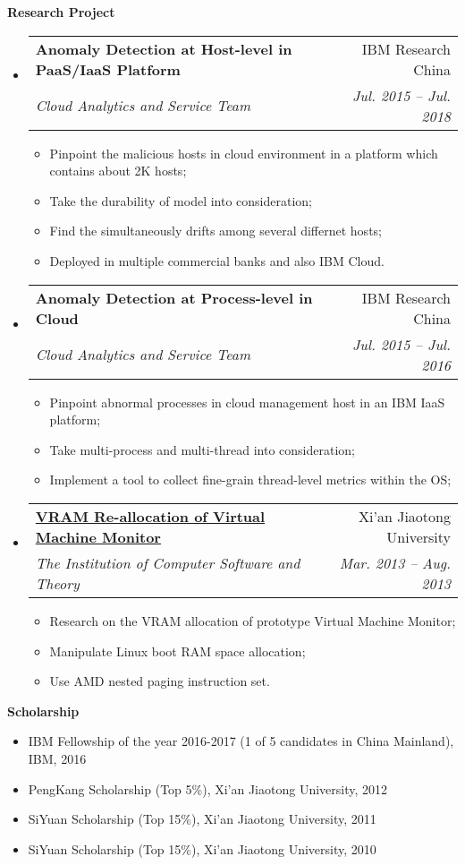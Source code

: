\documentclass[letterpaper,11pt]{article}
\makeatletter
\newcommand{\resitem}[1]{\item #1 \vspace{-2pt}}
\newcommand{\resheading}[1]{{\large \colorbox{mygrey}{\begin{minipage}{\textwidth}{\textbf{#1 \vphantom{p\^{E}}}}\end{minipage}}}}
\newcommand{\ressubheading}[4]{
\begin{tabular*}{6.5in}{l@{\extracolsep{\fill}}r}
		\textbf{#1} & #2 \\
		\textit{#3} & \textit{#4} \\
\end{tabular*}\vspace{-6pt}}
\makeatother
\begin{document}
\resheading{Research Project}
	\begin{itemize}
		\item 
			\ressubheading{Anomaly Detection at Host-level in PaaS/IaaS Platform}{IBM Research China}{Cloud Analytics and Service Team}{Jul. 2015 -- Jul. 2018}
				{ \footnotesize
				\begin{itemize}
					\resitem{Pinpoint the malicious hosts in cloud environment in a platform which contains about 2K hosts;}
					\resitem{Take the durability of model into consideration;}
					\resitem{Find the simultaneously drifts among several differnet hosts;}
					\resitem{Deployed in multiple commercial banks and also IBM Cloud.}
				\end{itemize}
				}
		\item 
			\ressubheading{Anomaly Detection at Process-level in Cloud}{IBM Research China}{Cloud Analytics and Service Team}{Jul. 2015 -- Jul. 2016}
				{ \footnotesize
				\begin{itemize}
					\resitem{Pinpoint abnormal processes in cloud management host in an IBM IaaS platform;}
					\resitem{Take multi-process and multi-thread into consideration;}
					\resitem{Implement a tool to collect fine-grain thread-level metrics within the OS;}
				\end{itemize}
				}
		\item 
			\ressubheading{\href{http://eiegrd.xjtu.edu.cn/}{VRAM Re-allocation of Virtual Machine Monitor}}{Xi'an Jiaotong University}{The Institution of Computer Software and Theory}{Mar. 2013 -- Aug. 2013}
				{ \footnotesize
				\begin{itemize}
					\resitem{Research on the VRAM allocation of prototype Virtual Machine Monitor;}
					\resitem{Manipulate Linux boot RAM space allocation;}
					\resitem{Use AMD nested paging instruction set.}
				\end{itemize}
				}
	\end{itemize}	

\resheading{Scholarship}
	\begin{itemize}
		\item
			IBM Fellowship of the year 2016-2017 (1 of 5 candidates in China Mainland), IBM, 2016
		\item
			PengKang Scholarship (Top 5\%), Xi'an Jiaotong University, 2012
		\item
			SiYuan Scholarship (Top 15\%), Xi'an Jiaotong University, 2011
		\item
			SiYuan Scholarship (Top 15\%), Xi'an Jiaotong University, 2010
	\end{itemize}
\end{document}
